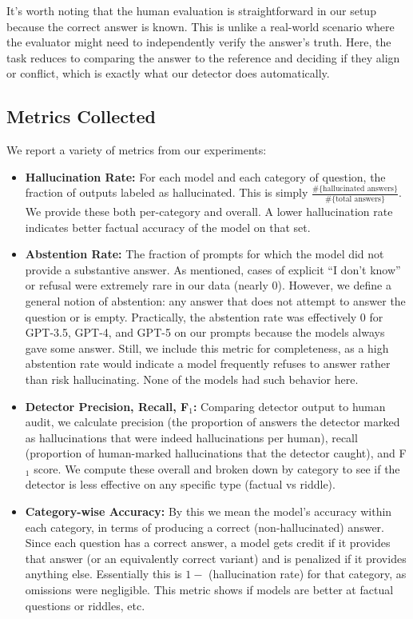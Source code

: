 \documentclass{article}
\begin{document}
It’s worth noting that the human evaluation is straightforward in our setup because the correct answer is known. This is unlike a real-world scenario where the evaluator might need to independently verify the answer’s truth. Here, the task reduces to comparing the answer to the reference and deciding if they align or conflict, which is exactly what our detector does automatically.

\subsection{Metrics Collected}
We report a variety of metrics from our experiments:
\begin{itemize}
    \item \textbf{Hallucination Rate:} For each model and each category of question, the fraction of outputs labeled as hallucinated. This is simply $\frac{\#\{\text{hallucinated answers}\}}{\#\{\text{total answers}\}}$. We provide these both per-category and overall. A lower hallucination rate indicates better factual accuracy of the model on that set.
    \item \textbf{Abstention Rate:} The fraction of prompts for which the model did not provide a substantive answer. As mentioned, cases of explicit “I don’t know” or refusal were extremely rare in our data (nearly 0). However, we define a general notion of abstention: any answer that does not attempt to answer the question or is empty. Practically, the abstention rate was effectively 0 for GPT-3.5, GPT-4, and GPT-5 on our prompts because the models always gave some answer. Still, we include this metric for completeness, as a high abstention rate would indicate a model frequently refuses to answer rather than risk hallucinating. None of the models had such behavior here.
    \item \textbf{Detector Precision, Recall, F$_1$:} Comparing detector output to human audit, we calculate precision (the proportion of answers the detector marked as hallucinations that were indeed hallucinations per human), recall (proportion of human-marked hallucinations that the detector caught), and F$_1$ score. We compute these overall and broken down by category to see if the detector is less effective on any specific type (factual vs riddle).
    \item \textbf{Category-wise Accuracy:} By this we mean the model’s accuracy within each category, in terms of producing a correct (non-hallucinated) answer. Since each question has a correct answer, a model gets credit if it provides that answer (or an equivalently correct variant) and is penalized if it provides anything else. Essentially this is $1 -$ (hallucination rate) for that category, as omissions were negligible. This metric shows if models are better at factual questions or riddles, etc.

\end{itemize}
\end{document}
